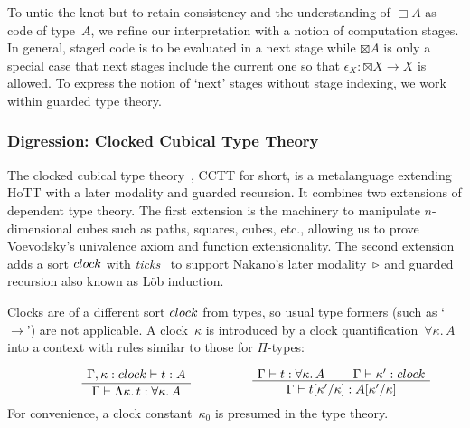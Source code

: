 \documentclass[a4paper,UKenglish,numberwithinsect,cleveref,thm-restate,draft]{lipics-v2021}
\numberwithin{equation}{section}
\theoremstyle{definition}
\theoremstyle{plain}
\begin{document}
To untie the knot but to retain consistency and the understanding of $\Box A$ as code of type~$A$, we refine our interpretation with a notion of computation stages.
In general, staged code is to be evaluated in a next stage while   $\boxtimes A$ is only a special case that next stages include the current one so that $\epsilon_X\colon {\boxtimes} X \to X$ is allowed.
To express the notion of `next' stages without stage indexing, we work within guarded type theory.

\subsubsection{Digression: Clocked Cubical Type Theory}
The clocked cubical type theory~\cite{Kristensen2021}, CCTT for short, is a metalanguage extending HoTT with a later modality and guarded recursion.
It combines two extensions of dependent type theory.
The first extension is the machinery to manipulate $n$-dimensional cubes such as paths, squares, cubes, etc., allowing us to prove Voevodsky’s univalence axiom and function extensionality.
The second extension adds a sort $\clock$ with \emph{ticks}~\cite{Bahr2017} to support Nakano's later modality~$\mathord{\triangleright}$ and guarded recursion also known as Löb induction.

Clocks are of a different sort $\clock$ from types, so usual type formers (such as `$\to$') are not applicable.
A clock~$\kappa$ is introduced by a clock quantification~$\forall \kappa.\, A$ into a context with rules similar to those for $\Pi$-types:
\[
  \begin{minipage}{0.47\linewidth}
    \begin{prooftree}
      \AxiomC{$\Gamma, \kappa : \clock \vdash t : A$}
      \UnaryInfC{$\Gamma \vdash \Lambda \kappa.\, t : \forall \kappa.\, A $}
    \end{prooftree}
  \end{minipage}
  \begin{minipage}{0.47\linewidth}
    \begin{prooftree}
      \AxiomC{$\Gamma \vdash t : \forall \kappa.\, A$}
      \AxiomC{$\Gamma \vdash \kappa' : \clock $}
      \BinaryInfC{$\Gamma \vdash t[\kappa'/\kappa] : A[\kappa'/\kappa]$}
    \end{prooftree}
  \end{minipage}
\]
For convenience, a clock constant~$\kappa_0$ is presumed in the type theory.%
\end{document}
